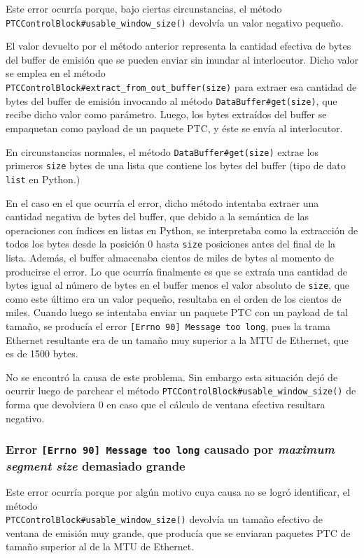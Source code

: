 \documentclass[a4paper, 10pt, twoside]{article}
\begin{document}
Este error ocurría porque, bajo ciertas circunstancias, el método \texttt{PTCControlBlock\#usable\_window\_size()} devolvía un valor negativo pequeño.

El valor devuelto por el método anterior representa la cantidad efectiva de bytes del buffer de emisión que se pueden enviar sin inundar al interlocutor. Dicho valor se emplea en el método \\ \texttt{PTCControlBlock\#extract\_from\_out\_buffer(size)} para extraer esa cantidad de bytes del buffer de emisión invocando al método \texttt{DataBuffer\#get(size)}, que recibe dicho valor como parámetro. Luego, los bytes extraídos del buffer se empaquetan como payload de un paquete PTC, y éste se envía al interlocutor. 

En circunstancias normales, el método \texttt{DataBuffer\#get(size)} extrae los primeros \texttt{size} bytes de una lista que contiene los bytes del buffer (tipo de dato \texttt{list} en Python.)

En el caso en el que ocurría el error, dicho método intentaba extraer una cantidad negativa de bytes del buffer, que debido a la semántica de las operaciones con índices en listas en Python, se interpretaba como la extracción de todos los bytes desde la posición 0 hasta \texttt{size} posiciones antes del final de la lista. Además, el buffer almacenaba cientos de miles de bytes al momento de producirse el error. Lo que ocurría finalmente es que se extraía una cantidad de bytes igual al número de bytes en el buffer menos el valor absoluto de \texttt{size}, que como este último era un valor pequeño, resultaba en el orden de los cientos de miles. Cuando luego se intentaba enviar un paquete PTC con un payload de tal tamaño, se producía el error \texttt{[Errno 90] Message too long}, pues la trama Ethernet resultante era de un tamaño muy superior a la MTU de Ethernet, que es de 1500 bytes.

No se encontró la causa de este problema. Sin embargo esta situación dejó de ocurrir luego de parchear el método \texttt{PTCControlBlock\#usable\_window\_size()} de forma que devolviera 0 en caso que el cálculo de ventana efectiva resultara negativo.


\subsubsection{Error \texttt{[Errno 90] Message too long} causado por \emph{maximum segment size} demasiado grande}
\label{sec:error-mss}

Este error ocurría porque por algún motivo cuya causa no se logró identificar, el método \\ \texttt{PTCControlBlock\#usable\_window\_size()} devolvía un tamaño efectivo de ventana de emisión muy grande, que producía que se enviaran paquetes PTC de tamaño superior al de la MTU de Ethernet.
\end{document}
